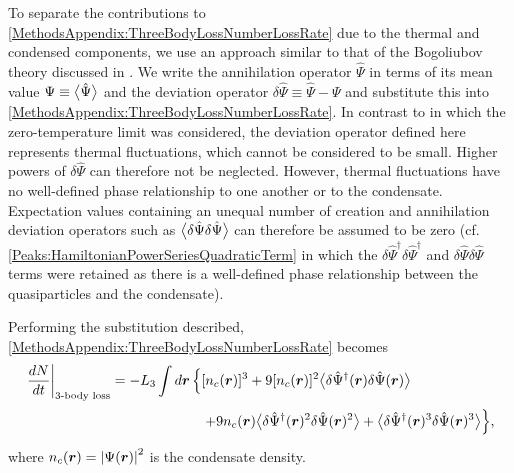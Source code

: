 To separate the contributions to \eqref{MethodsAppendix:ThreeBodyLossNumberLossRate} due to the thermal and condensed components, we use an approach similar to that of the Bogoliubov theory discussed in .  We write the annihilation operator $\hat{\Psi}$ in terms of its mean value $\Psi \equiv {\ensuremath{\big<\hat{\Psi}\big>}}$ and the deviation operator $\delta \hat{\Psi} \equiv \hat{\Psi} - \Psi$ and substitute this into \eqref{MethodsAppendix:ThreeBodyLossNumberLossRate}.  In contrast to  in which the zero-temperature limit was considered, the deviation operator defined here represents thermal fluctuations, which cannot be considered to be small.  Higher powers of $\delta\hat{\Psi}$ can therefore not be neglected.  However, thermal fluctuations have no well-defined phase relationship to one another or to the condensate.  Expectation values containing an unequal number of creation and annihilation deviation operators such as ${\big<\delta\hat{\Psi}\delta\hat{\Psi}\big>}$ can therefore be assumed to be zero (cf. \eqref{Peaks:HamiltonianPowerSeriesQuadraticTerm} in which the $\delta\hat{\Psi}^\dagger \delta\hat{\Psi}^\dagger$ and $\delta\hat{\Psi}\delta\hat{\Psi}$ terms were retained as there is a well-defined phase relationship between the quasiparticles and the condensate).

Performing the substitution described, \eqref{MethodsAppendix:ThreeBodyLossNumberLossRate} becomes
\begin{align}
    \begin{split}
        \left.\frac{d N}{dt} \right|_\text{3-body loss} &=  -L_3 \int d \vect{r}\, \Big\{[n_c(\vect{r})]^3 + 9 [n_c(\vect{r})]^2 \mean{\delta\hat{\Psi}^\dagger(\vect{r}) \delta\hat{\Psi}(\vect{r})}\\
        &\relphantom{=-L_3 \int d \vect{r}\,\Big\{} + 9 n_c(\vect{r}) \mean{\delta\hat{\Psi}^\dagger(\vect{r})^2 \delta\hat{\Psi}(\vect{r})^2} + \mean{\delta\hat{\Psi}^\dagger(\vect{r})^3 \delta\hat{\Psi}(\vect{r})^3}\Big\},
    \end{split}
    \label{MethodsAppendix:ThreeBodyLossNumberLossRateInTermsOfDeviationOperators}
\end{align}
where $n_c(\bm{r}) = \left|\Psi(\bm{r})\right|^2$ is the condensate density.

